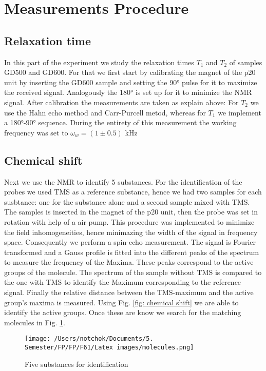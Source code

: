 \section{Measurements Procedure}
\subsection{Relaxation time}
In this part of the experiment we study the relaxation times $T_1$ and $T_2$ of samples GD500 and GD600. For that we first start by calibrating the magnet of the p20 unit by inserting the GD600 sample and setting the 90° pulse for it to maximize the received signal. Analogously the 180° is set up for it to minimize the NMR signal. 
After calibration the measurements are taken as explain above: For $T_2$ we use the Hahn echo method and Carr-Purcell metod, whereas for $T_1$ we implement a 180°-90° sequence. 
During the entirety of this measurement the working frequency was set to $\omega_w = (1 \pm 0.5)$ kHz
\subsection{Chemical shift}
\label{sec: chemical shift}
Next we use the NMR to identify 5 substances. For the identification of the probes we used TMS as a reference substance, hence we had two samples for each susbtance: one for the substance alone and a second sample mixed with TMS.
The samples is inserted in the magnet of the p20 unit, then the probe was set in rotation with help of a air pump. This procedure was implemented to minimize the field inhomogeneities, hence minimazing the width of the signal in frequency space. Consequently we perform a spin-echo measurement. The signal is Fourier transformed and a Gauss profile is fitted into the different peaks of the spectrum to measure the frequency of the Maxima. These peaks correspond to the active groups of the molecule.
The spectrum of the sample without TMS is compared to the one with TMS to identify the Maximum corresponding to the reference signal. Finally the relative distance between the TMS-maximum and the active group's maxima is measured. Using Fig. \ref{fig: chemical shift} we are able to identify the active groups. Once these are know we search for the matching molecules in Fig. \ref{fig: identification}.
\begin{figure}[!htbp]
 \begin{center}
  \texttt{[image: /Users/notchok/Documents/5. Semester/FP/FP/F61/Latex images/molecules.png]}
  \caption[]{Five substances for identification \footnotemark}
    \label{fig: identification}
 \end{center}
\end{figure}
